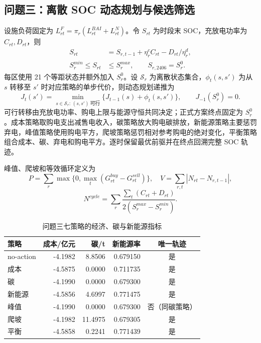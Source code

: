\subsection{问题三：离散 SOC 动态规划与候选筛选}
设施负荷固定为 $L^F_{rt}=\pi_r(L^{BAI}_{rt}+L^N_{rt})$。令 $S_{rt}$ 为时段末 SOC，充放电功率为 $C_{rt},D_{rt}$，则
\begin{align}
S_{rt}&=S_{r,t-1}+\eta_r^cC_{rt}-D_{rt}/\eta_r^d,\\
S_r^{min}\le S_{rt}&\le S_r^{max},\qquad S_{r,2406}=S_r^0.
\end{align}
每区使用 21 个等距状态并额外加入 $S_r^0$。设 $\mathcal S_r$ 为离散状态集合，$\phi_t(s,s')$ 为从 $s$ 转移至 $s'$ 时对应策略的单步代价，则动态规划递推为
\begin{equation}
J_t(s')=\min_{s\in\mathcal S_r:\,(s,s')\ \text{可行}}\{J_{t-1}(s)+\phi_t(s,s')\},
\qquad J_{-1}(S_r^0)=0.
\end{equation}
可行转移由充放电功率、购电上限与能源守恒共同决定；正式方案终点固定为 $S_r^0$。成本策略取购电支出减售电收入，碳策略放大购电碳排放，新能源策略主要惩罚弃电，峰值策略使用购电平方，爬坡策略惩罚相对参考购电的绝对变化，平衡策略组合成本、碳、弃电和购电平方。逐时保留最优前驱并在终点回溯完整 SOC 轨迹。

峰值、爬坡和等效循环定义为
\begin{equation}
P=\sum_r\max\{0,\max_t(G^{buy}_{rt}-G^{sell}_{rt})\},\quad
V=\sum_{r,t}|N_{rt}-N_{r,t-1}|,
\end{equation}
\begin{equation}
N^{cycle}=\sum_r\frac{\sum_t(C_{rt}+D_{rt})}{2(S_r^{max}-S_r^{min})}.
\end{equation}

\begin{table}[H]\centering
{\small
\caption{问题三七策略的经济、碳与新能源指标}\label{tab:q3policies}
\begin{tabular}{lrrrc}\toprule
策略 & 成本/亿元 & 碳/t & 新能源率 & 唯一轨迹\\\midrule
no-action & -4.1982 & 8.8506 & 0.679150 & 是\\
成本 & -4.5875 & 0.0000 & 0.711735 & 是\\
碳 & -4.1990 & 0.0000 & 0.679300 & 是\\
新能源 & -4.5856 & 4.6997 & 0.771475 & 是\\
峰值 & -4.1990 & 0.0000 & 0.679300 & 否（同碳策略）\\
爬坡 & -4.1982 & 11.4975 & 0.679305 & 是\\
平衡 & -4.5858 & 0.2241 & 0.771439 & 是\\\bottomrule
\end{tabular}
}
\end{table}

